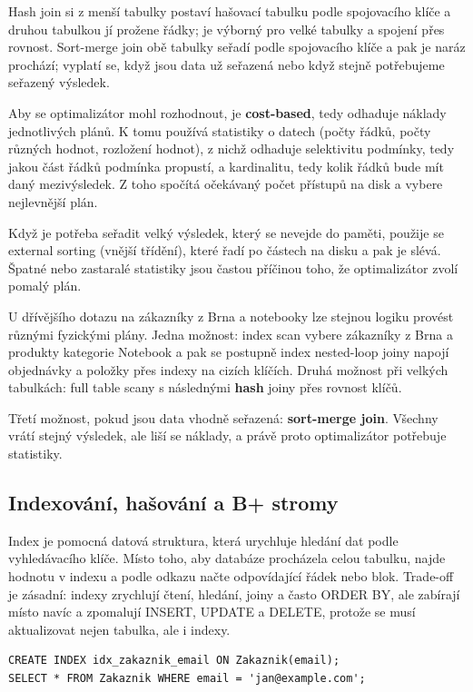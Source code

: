 Hash join si z menší tabulky postaví hašovací tabulku podle spojovacího klíče a druhou tabulkou jí prožene řádky; je výborný pro velké tabulky a spojení přes rovnost. Sort-merge join obě tabulky seřadí podle spojovacího klíče a pak je naráz prochází; vyplatí se, když jsou data už seřazená nebo když stejně potřebujeme seřazený výsledek.

Aby se optimalizátor mohl rozhodnout, je \textbf{cost-based}, tedy odhaduje náklady jednotlivých plánů. K tomu používá statistiky o datech (počty řádků, počty různých hodnot, rozložení hodnot), z nichž odhaduje selektivitu podmínky, tedy jakou část řádků podmínka propustí, a kardinalitu, tedy kolik řádků bude mít daný mezivýsledek. Z toho spočítá očekávaný počet přístupů na disk a vybere nejlevnější plán.

Když je potřeba seřadit velký výsledek, který se nevejde do paměti, použije se external sorting (vnější třídění), které řadí po částech na disku a pak je slévá. Špatné nebo zastaralé statistiky jsou častou příčinou toho, že optimalizátor zvolí pomalý plán.

U dřívějšího dotazu na zákazníky z Brna a notebooky lze stejnou logiku provést různými fyzickými plány. Jedna možnost: index scan vybere zákazníky z Brna a produkty kategorie Notebook a pak se postupně index nested-loop joiny napojí objednávky a položky přes indexy na cizích klíčích. Druhá možnost při velkých tabulkách: full table scany s následnými \textbf{hash} joiny přes rovnost klíčů.

Třetí možnost, pokud jsou data vhodně seřazená: \textbf{sort-merge join}. Všechny vrátí stejný výsledek, ale liší se náklady, a právě proto optimalizátor potřebuje statistiky.

\subsection*{Indexování, hašování a B+ stromy}

Index je pomocná datová struktura, která urychluje hledání dat podle vyhledávacího klíče. Místo toho, aby databáze procházela celou tabulku, najde hodnotu v indexu a podle odkazu načte odpovídající řádek nebo blok. Trade-off je zásadní: indexy zrychlují čtení, hledání, joiny a často ORDER BY, ale zabírají místo navíc a zpomalují INSERT, UPDATE a DELETE, protože se musí aktualizovat nejen tabulka, ale i indexy.

\begin{codebox}
\small
\begin{verbatim}
CREATE INDEX idx_zakaznik_email ON Zakaznik(email);
SELECT * FROM Zakaznik WHERE email = 'jan@example.com';
\end{verbatim}
\end{codebox}


